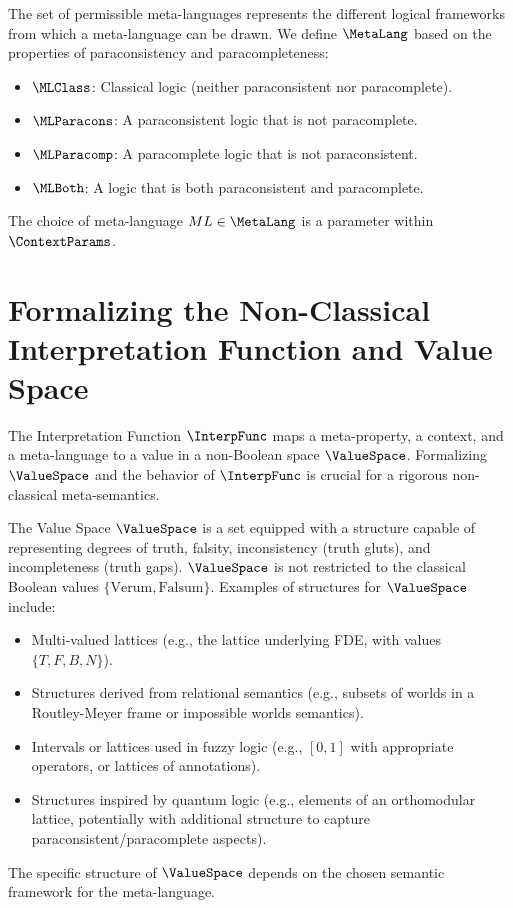 	\begin{definition}
		The set of permissible meta-languages represents the different logical frameworks from which a meta-language can be drawn. We define $\MetaLang$ based on the properties of paraconsistency and paracompleteness:
		\begin{itemize}[nosep] %
			\item $\MLClass$: Classical logic (neither paraconsistent nor paracomplete).
			\item $\MLParacons$: A paraconsistent logic that is not paracomplete.
			\item $\MLParacomp$: A paracomplete logic that is not paraconsistent.
			\item $\MLBoth$: A logic that is both paraconsistent and paracomplete.
		\end{itemize}
		The choice of meta-language $ML \in \MetaLang$ is a parameter within $\ContextParams$.
	\end{definition}
	
	\section{Formalizing the Non-Classical Interpretation Function and Value Space}
	
	The Interpretation Function $\InterpFunc$ maps a meta-property, a context, and a meta-language to a value in a non-Boolean space $\ValueSpace$. Formalizing $\ValueSpace$ and the behavior of $\InterpFunc$ is crucial for a rigorous non-classical meta-semantics.
	
	\begin{definition}
		The Value Space $\ValueSpace$ is a set equipped with a structure capable of representing degrees of truth, falsity, inconsistency (truth gluts), and incompleteness (truth gaps). $\ValueSpace$ is not restricted to the classical Boolean values $\{\text{Verum}, \text{Falsum}\}$. Examples of structures for $\ValueSpace$ include:
		\begin{itemize}[wide, labelwidth=!, labelindent=0pt, before=\RaggedRight, after=\RaggedRight] %
			\item Multi-valued lattices (e.g., the lattice underlying FDE, with values $\{T, F, B, N\}$).
			\item Structures derived from relational semantics (e.g., subsets of worlds in a Routley-Meyer frame or impossible worlds semantics).
			\item Intervals or lattices used in fuzzy logic (e.g., $[0,1]$ with appropriate operators, or lattices of annotations).
			\item Structures inspired by quantum logic (e.g., elements of an orthomodular lattice, potentially with additional structure to capture paraconsistent/paracomplete aspects).
			\end{itemize}
				The specific structure of $\ValueSpace$ depends on the chosen semantic framework for the meta-language.
				\end{definition}
					
